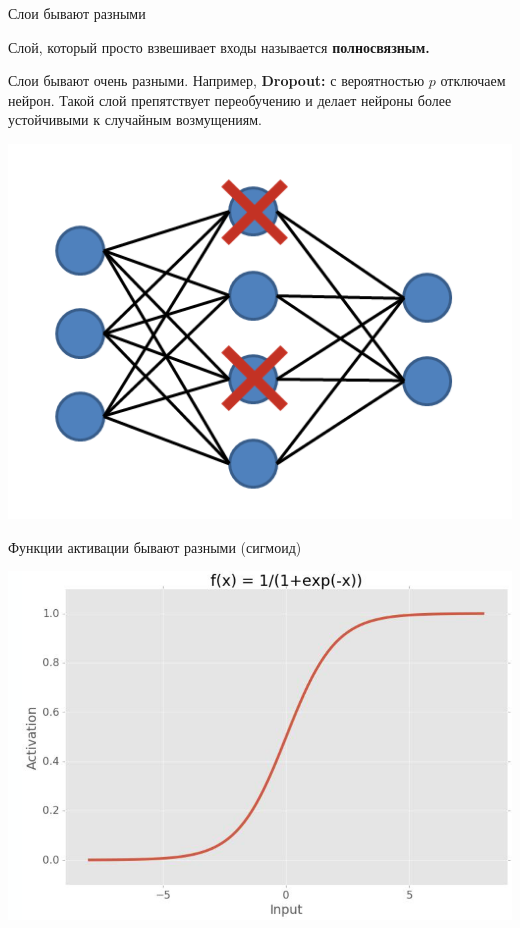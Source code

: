 \documentclass[notes,12pt, aspectratio=169]{beamer}
\newenvironment{wideitemize}{\itemize\addtolength{\itemsep}{10pt}}{\enditemize}
\begin{document}
\begin{frame}{Слои бывают разными}
\begin{wideitemize}
	\item Слой, который просто взвешивает входы называется \textbf{полносвязным.}
	
	\item Слои бывают очень разными. Например, \textbf{Dropout:}  с вероятностью $p$ отключаем нейрон. Такой слой препятствует переобучению и делает нейроны более устойчивыми к случайным возмущениям.
\end{wideitemize}
\begin{center}
	\includegraphics[width=0.3\paperwidth]{dropout.png}
\end{center}
\end{frame}


\begin{frame}{Функции активации бывают разными (сигмоид)}
\begin{center}
	\includegraphics[width=0.65\paperwidth]{sigmoid.png}
\end{center}
\end{frame}
\end{document}
